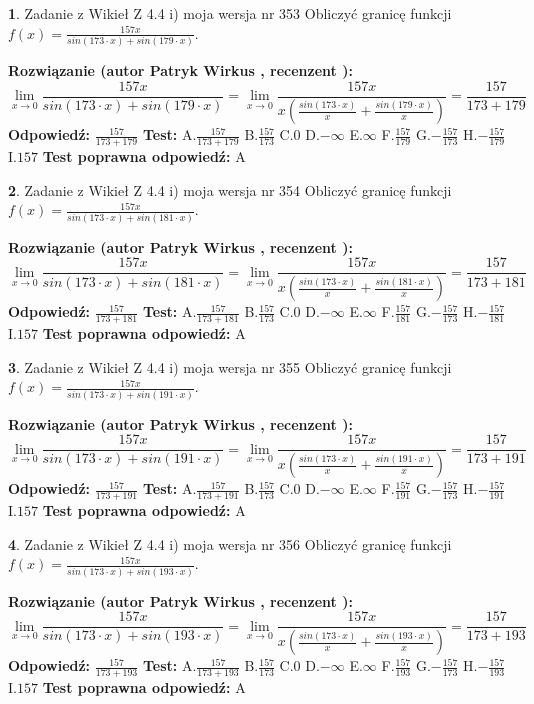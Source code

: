 \documentclass[12pt, a4paper]{article}
\theoremstyle{definition} %
\newtheorem{zad}{}
\newcommand{\zadStart}[1]{\begin{zad}#1\newline}
\newcommand{\zadStop}{\end{zad}}
\newcommand{\rozwStart}[2]{\noindent \textbf{Rozwiązanie (autor #1 , recenzent #2): }\newline}
\newcommand{\rozwStop}{\newline}
\newcommand{\odpStart}{\noindent \textbf{Odpowiedź:}\newline}
\newcommand{\odpStop}{\newline}
\newcommand{\testStart}{\noindent \textbf{Test:}\newline}
\newcommand{\testStop}{\newline}
\newcommand{\kluczStart}{\noindent \textbf{Test poprawna odpowiedź:}\newline}
\newcommand{\kluczStop}{\newline}
\begin{document}
\zadStart{Zadanie z Wikieł Z 4.4 i) moja wersja nr 353}
Obliczyć granicę funkcji $f(x)=\frac{157x}{sin(173\cdot x) +sin(179\cdot x)}$.
\zadStop
\rozwStart{Patryk Wirkus}{}
$$\lim\limits_{x\to 0}\frac{157x}{sin(173\cdot x) +sin(179\cdot x)}=\lim\limits_{x\to 0}\frac{157x}{x(\frac{sin(173\cdot x)}{x}+\frac{sin(179\cdot x)}{x})}=\frac{157}{173+179}$$
\rozwStop
\odpStart
$\frac{157}{173+179}$
\odpStop
\testStart
A.$\frac{157}{173+179}$
B.$\frac{157}{173}$
C.$0$
D.$-\infty$
E.$\infty$
F.$\frac{157}{179}$
G.$-\frac{157}{173}$
H.$-\frac{157}{179}$
I.$157$
\testStop
\kluczStart
A
\kluczStop



\zadStart{Zadanie z Wikieł Z 4.4 i) moja wersja nr 354}
Obliczyć granicę funkcji $f(x)=\frac{157x}{sin(173\cdot x) +sin(181\cdot x)}$.
\zadStop
\rozwStart{Patryk Wirkus}{}
$$\lim\limits_{x\to 0}\frac{157x}{sin(173\cdot x) +sin(181\cdot x)}=\lim\limits_{x\to 0}\frac{157x}{x(\frac{sin(173\cdot x)}{x}+\frac{sin(181\cdot x)}{x})}=\frac{157}{173+181}$$
\rozwStop
\odpStart
$\frac{157}{173+181}$
\odpStop
\testStart
A.$\frac{157}{173+181}$
B.$\frac{157}{173}$
C.$0$
D.$-\infty$
E.$\infty$
F.$\frac{157}{181}$
G.$-\frac{157}{173}$
H.$-\frac{157}{181}$
I.$157$
\testStop
\kluczStart
A
\kluczStop



\zadStart{Zadanie z Wikieł Z 4.4 i) moja wersja nr 355}
Obliczyć granicę funkcji $f(x)=\frac{157x}{sin(173\cdot x) +sin(191\cdot x)}$.
\zadStop
\rozwStart{Patryk Wirkus}{}
$$\lim\limits_{x\to 0}\frac{157x}{sin(173\cdot x) +sin(191\cdot x)}=\lim\limits_{x\to 0}\frac{157x}{x(\frac{sin(173\cdot x)}{x}+\frac{sin(191\cdot x)}{x})}=\frac{157}{173+191}$$
\rozwStop
\odpStart
$\frac{157}{173+191}$
\odpStop
\testStart
A.$\frac{157}{173+191}$
B.$\frac{157}{173}$
C.$0$
D.$-\infty$
E.$\infty$
F.$\frac{157}{191}$
G.$-\frac{157}{173}$
H.$-\frac{157}{191}$
I.$157$
\testStop
\kluczStart
A
\kluczStop



\zadStart{Zadanie z Wikieł Z 4.4 i) moja wersja nr 356}
Obliczyć granicę funkcji $f(x)=\frac{157x}{sin(173\cdot x) +sin(193\cdot x)}$.
\zadStop
\rozwStart{Patryk Wirkus}{}
$$\lim\limits_{x\to 0}\frac{157x}{sin(173\cdot x) +sin(193\cdot x)}=\lim\limits_{x\to 0}\frac{157x}{x(\frac{sin(173\cdot x)}{x}+\frac{sin(193\cdot x)}{x})}=\frac{157}{173+193}$$
\rozwStop
\odpStart
$\frac{157}{173+193}$
\odpStop
\testStart
A.$\frac{157}{173+193}$
B.$\frac{157}{173}$
C.$0$
D.$-\infty$
E.$\infty$
F.$\frac{157}{193}$
G.$-\frac{157}{173}$
H.$-\frac{157}{193}$
I.$157$
\testStop
\kluczStart
A
\kluczStop
\end{document}
